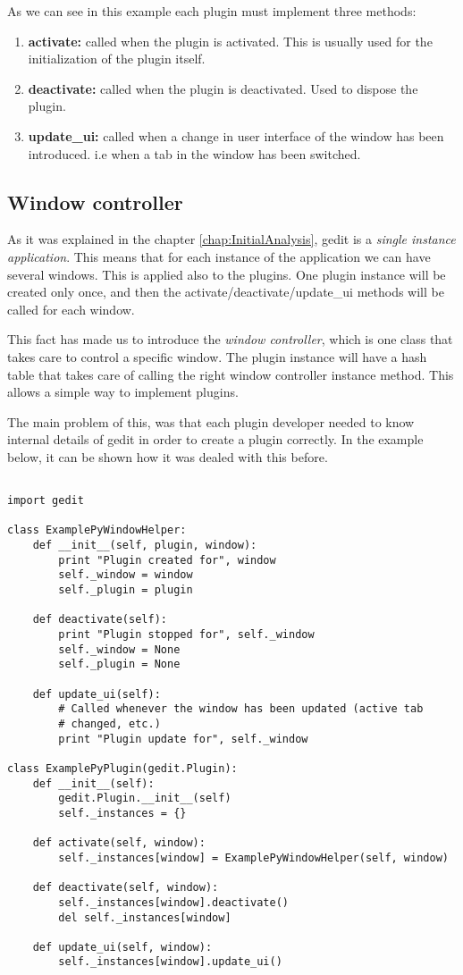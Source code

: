 As we can see in this example each plugin must implement three methods:
\begin{enumerate}
  \item \textbf{activate:} called when the plugin is activated. This is usually used for the initialization of the plugin itself.
  \item \textbf{deactivate:} called when the plugin is deactivated. Used to dispose the plugin.
  \item \textbf{update\_ui:} called when a change in user interface of the window has been introduced. i.e when a tab in the window has been switched.
\end{enumerate}

\subsection{Window controller}

As it was explained in the chapter \ref{chap:InitialAnalysis}, gedit is a \emph{single instance application}. This means that for each instance of the application we can have several windows. This is applied also to the plugins. One plugin instance will be created only once, and then the activate/deactivate/update\_ui methods will be called for each window.

This fact has made us to introduce the \emph{window controller}, which is one class that takes care to control a specific window. The plugin instance will have a hash table that takes care of calling the right window controller instance method. This allows a simple way to implement plugins.

The main problem of this, was that each plugin developer needed to know internal details of gedit in order to create a plugin correctly. In the example below, it can be shown how it was dealed with this before.

\begin{lstlisting}[style=python]

import gedit

class ExamplePyWindowHelper:
    def __init__(self, plugin, window):
        print "Plugin created for", window
        self._window = window
        self._plugin = plugin

    def deactivate(self):
        print "Plugin stopped for", self._window
        self._window = None
        self._plugin = None

    def update_ui(self):
        # Called whenever the window has been updated (active tab
        # changed, etc.)
        print "Plugin update for", self._window

class ExamplePyPlugin(gedit.Plugin):
    def __init__(self):
        gedit.Plugin.__init__(self)
        self._instances = {}

    def activate(self, window):
        self._instances[window] = ExamplePyWindowHelper(self, window)

    def deactivate(self, window):
        self._instances[window].deactivate()
        del self._instances[window]

    def update_ui(self, window):
        self._instances[window].update_ui()

\end{lstlisting}



